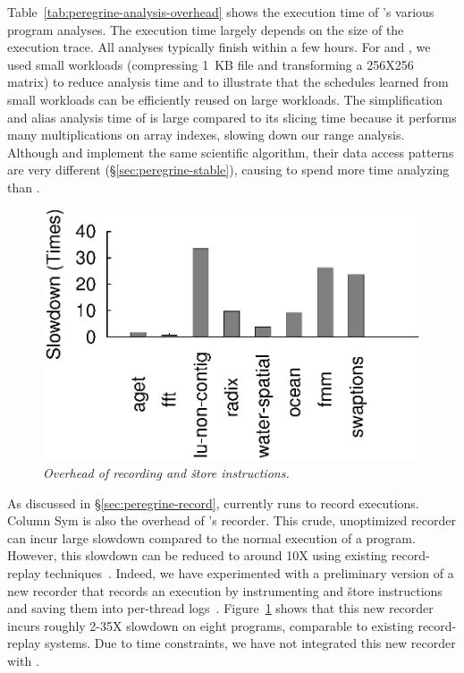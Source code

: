   Table~\ref{tab:peregrine-analysis-overhead}
shows the execution time of \peregrine's various program analyses.  The
execution time largely depends on the size of the execution trace.  All
analyses typically finish within a few hours.  For \pbzip and \fft, we
used small workloads (compressing 1~KB file and transforming a 256X256
matrix) to reduce analysis time and to illustrate that the schedules
learned from small workloads can be efficiently reused on large workloads.
The simplification and alias analysis time of \fft is large compared to its
slicing time because it performs many multiplications on array indexes,
slowing down our range analysis.  Although \lun and \luc implement the
same scientific algorithm, their data access patterns are very different
(\S\ref{sec:peregrine-stable}), causing \peregrine to spend more time analyzing \lun than \luc.

\begin{figure}[b!]
\centering
\includegraphics[width=.7\columnwidth]{peregrine/figures/new-recorder.eps}
\vspace{-.25in}
\caption{{\em Overhead of recording  and \v{store} instructions.}} \label{fig:peregrine-new-recorder-overhead}
\end{figure}

As discussed in \S\ref{sec:peregrine-record}, \peregrine currently runs \klee to record
executions.  Column Sym is also the overhead of \peregrine's recorder.  This
crude, unoptimized recorder can incur large slowdown compared to
the normal execution of a program.  However, this slowdown can be reduced
to around 10X using existing record-replay
techniques~\cite{idna:vee06,scribe:sigmetrics10}.  Indeed, we have
experimented with a preliminary version of a new recorder that records an
execution by instrumenting  and \v{store} instructions and saving
them into per-thread logs~\cite{idna:vee06}.  Figure~\ref{fig:peregrine-new-recorder-overhead} shows that
this new recorder incurs roughly 2-35X slowdown on eight programs,
comparable to existing record-replay systems.  Due to time
constraints, we have not integrated this new recorder with \peregrine.



